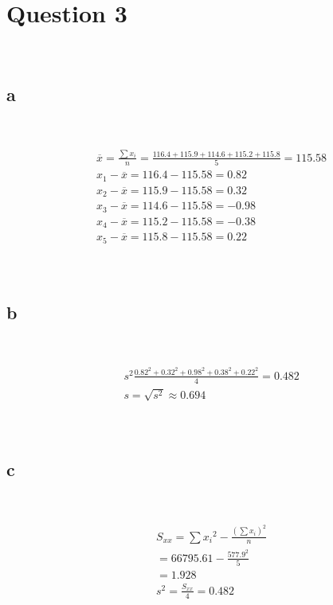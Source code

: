 \documentclass{article}
\begin{document}
\newpage

\section*{Question 3}

~

\subsection*{a}

~

\begin{align*}
    &\overline{x}=\frac{\sum x_i}{n}=\frac{116.4+115.9+114.6+115.2+115.8}{5}=115.58\\
    &x_1-\overline{x}=116.4-115.58=0.82\\
    &x_2-\overline{x}=115.9-115.58=0.32\\
    &x_3-\overline{x}=114.6-115.58=-0.98\\
    &x_4-\overline{x}=115.2-115.58=-0.38\\
    &x_5-\overline{x}=115.8-115.58=0.22\\
\end{align*}

~

\subsection*{b}

~

\begin{align*}
    &s^2\frac{0.82^2+0.32^2+0.98^2+0.38^2+0.22^2}{4}=0.482\\
    &s=\sqrt{s^2}\approx0.694\\
\end{align*}

~

\subsection*{c}

~

\begin{align*}
    &S_{xx}=\sum{x_i}^2-\frac{(\sum x_i)^2}{n}\\
    &=66795.61-\frac{577.9^2}{5}\\
    &=1.928\\
    &s^2=\frac{S_{xx}}{4}=0.482\\
\end{align*}
\end{document}

